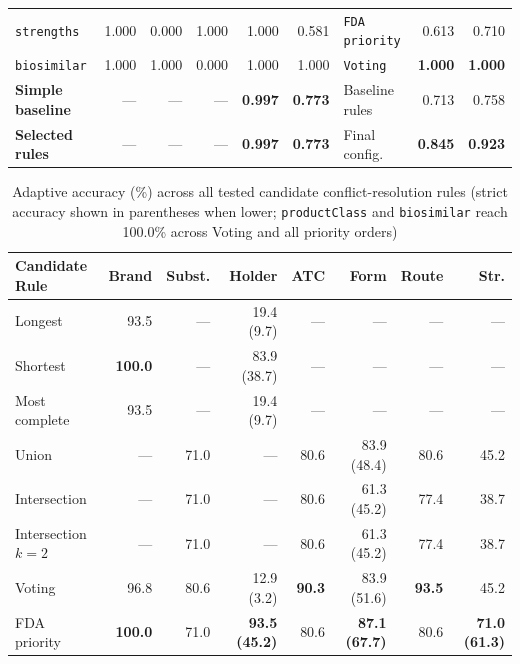 \documentclass{llncs}
\begin{document}
\begin{table}[htbp]
\begin{tabularx}{\textwidth}{|>{\raggedright\arraybackslash}X|r|r|r|r|r|l|r|r|}
\texttt{strengths}            & 1.000 & 0.000 & 1.000 & 1.000 & 0.581 & \texttt{FDA priority} & 0.613 & 0.710 \\
\texttt{biosimilar}           & 1.000 & 1.000 & 0.000 & 1.000 & 1.000 & \texttt{Voting}       & \textbf{1.000} & \textbf{1.000} \\
\hline
\textbf{Simple baseline}      & ---   & ---   & ---   & \textbf{0.997} & \textbf{0.773} & Baseline rules & 0.713 & 0.758 \\
\textbf{Selected rules}       & ---   & ---   & ---   & \textbf{0.997} & \textbf{0.773} & Final config.  & \textbf{0.845} & \textbf{0.923} \\
\hline
\end{tabularx}
\end{table}

\begin{table}[htbp]
\centering
\caption{Adaptive accuracy (\%) across all tested candidate conflict-resolution rules (strict accuracy shown in parentheses when lower; \texttt{productClass} and \texttt{biosimilar} reach 100.0\% across Voting and all priority orders)}
\label{tab:fusion_rule_comparison}
\scriptsize
\setlength{\tabcolsep}{2.0pt}
\begin{tabularx}{\textwidth}{|>{\raggedright\arraybackslash}X|r|r|r|r|r|r|r|}
\hline
\textbf{Candidate Rule} & \textbf{Brand} & \textbf{Subst.} & \textbf{Holder} & \textbf{ATC} & \textbf{Form} & \textbf{Route} & \textbf{Str.} \\
\hline
Longest                &  93.5 & ---  & 19.4 (9.7)  & ---  & ---         & ---  & --- \\
Shortest               & \textbf{100.0} & ---  & 83.9 (38.7) & ---  & ---         & ---  & --- \\
Most complete          &  93.5 & ---  & 19.4 (9.7)  & ---  & ---         & ---  & --- \\
Union                  & ---   & 71.0 & ---         & 80.6 & 83.9 (48.4) & 80.6 & 45.2 \\
Intersection           & ---   & 71.0 & ---         & 80.6 & 61.3 (45.2) & 77.4 & 38.7 \\
Intersection $k=2$     & ---   & 71.0 & ---         & 80.6 & 61.3 (45.2) & 77.4 & 38.7 \\
\hline
Voting                 &  96.8 & 80.6 & 12.9 (3.2)  & \textbf{90.3} & 83.9 (51.6) & \textbf{93.5} & 45.2 \\
FDA priority           & \textbf{100.0} & 71.0 & \textbf{93.5 (45.2)} & 80.6 & \textbf{87.1 (67.7)} & 80.6 & \textbf{71.0 (61.3)} \\

\end{tabularx}
\end{table}
\end{document}
